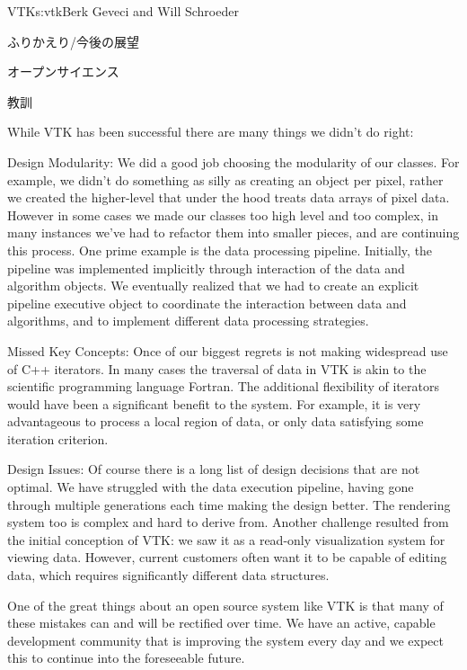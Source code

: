 \begin{aosachapter}{VTK}{s:vtk}{Berk Geveci and Will Schroeder}
\begin{aosasect1}{ふりかえり/今後の展望}
\begin{aosasect2}{オープンサイエンス}
\end{aosasect2}

\begin{aosasect2}{教訓}

While VTK has been successful there are many things we didn't do
right:

\begin{aosadescription}

  \item{Design Modularity}: We did a good job choosing the
  modularity of our classes. For example, we didn't do something as
  silly as creating an object per pixel, rather we created the
  higher-level  that under the hood treats data arrays of
  pixel data. However in some cases we made our classes too high level
  and too complex, in many instances we've had to refactor them into
  smaller pieces, and are continuing this process. One prime example
  is the data processing pipeline.  Initially, the pipeline was
  implemented implicitly through interaction of the data and algorithm
  objects. We eventually realized that we had to create an explicit
  pipeline executive object to coordinate the interaction between data
  and algorithms, and to implement different data processing
  strategies.

  \item{Missed Key Concepts}: Once of our biggest regrets is not
  making widespread use of C++ iterators. In many cases the traversal
  of data in VTK is akin to the scientific programming language
  Fortran\@. The additional flexibility of iterators would have been a
  significant benefit to the system. For example, it is very
  advantageous to process a local region of data, or only data
  satisfying some iteration criterion.

  \item{Design Issues}: Of course there is a long list of design
  decisions that are not optimal. We have struggled with the data
  execution pipeline, having gone through multiple generations each
  time making the design better. The rendering system too is complex
  and hard to derive from. Another challenge resulted from the initial
  conception of VTK: we saw it as a read-only visualization system for
  viewing data. However, current customers often want it to be capable
  of editing data, which requires significantly different data
  structures.

\end{aosadescription}

One of the great things about an open source system like VTK is that
many of these mistakes can and will be rectified over time. We have an
active, capable development community that is improving the system
every day and we expect this to continue into the foreseeable future.

\end{aosasect2}

\end{aosasect1}

\end{aosachapter}

